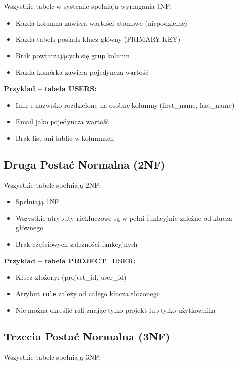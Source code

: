 \documentclass[12pt,a4paper]{report}
\begin{document}
Wszystkie tabele w systemie spełniają wymagania 1NF:

\begin{itemize}
    \item Każda kolumna zawiera wartości atomowe (niepodzielne)
    \item Każda tabela posiada klucz główny (PRIMARY KEY)
    \item Brak powtarzających się grup kolumn
    \item Każda komórka zawiera pojedynczą wartość
\end{itemize}

\textbf{Przykład -- tabela USERS:}
\begin{itemize}
    \item Imię i nazwisko rozdzielone na osobne kolumny (first\_name, last\_name)
    \item Email jako pojedyncza wartość
    \item Brak list ani tablic w kolumnach
\end{itemize}

\subsection{Druga Postać Normalna (2NF)}

Wszystkie tabele spełniają 2NF:

\begin{itemize}
    \item Spełniają 1NF
    \item Wszystkie atrybuty niekluczowe są w pełni funkcyjnie zależne od klucza głównego
    \item Brak częściowych zależności funkcyjnych
\end{itemize}

\textbf{Przykład -- tabela PROJECT\_USER:}
\begin{itemize}
    \item Klucz złożony: (project\_id, user\_id)
    \item Atrybut \texttt{role} zależy od całego klucza złożonego
    \item Nie można określić roli znając tylko projekt lub tylko użytkownika
\end{itemize}

\subsection{Trzecia Postać Normalna (3NF)}

Wszystkie tabele spełniają 3NF:
\end{document}
